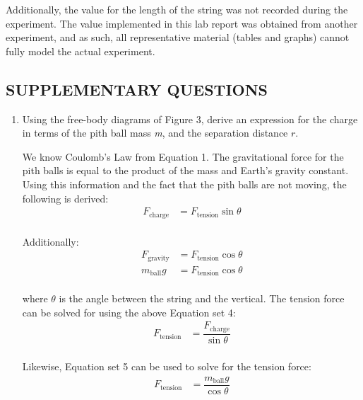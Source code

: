 \documentclass [12pt, letterpaper, twoside] {article}
\begin{document}
Additionally, the value for the length of the string was not recorded during the experiment. The value implemented in this lab report was obtained from another experiment, and as such, all representative material (tables and graphs) cannot fully model the actual experiment.

\subsection* {SUPPLEMENTARY QUESTIONS}
\begin{enumerate}
  \item{Using the free-body diagrams of Figure 3, derive an expression for the charge in terms of the pith ball mass \emph{m}, and the separation distance \(r\).}

    We know Coulomb's Law from Equation 1. The gravitational force for the pith balls is equal to the product of the mass and Earth's gravity constant. Using this information and the fact that the pith balls are not moving, the following is derived:
    \begin{equation*}
      \begin{split}
        F_{\text{charge}} &= F_{\text{tension}}\sin{\theta} \\
      \end{split}
    \end{equation*}

    \noindent
    Additionally:
    \begin{equation}
      \begin{split}
        F_{\text{gravity}} &= F_{\text{tension}}\cos{\theta} \\
        m_{\text{ball}}g &= F_{\text{tension}}\cos{\theta} \\
      \end{split}
    \end{equation}

    \noindent
    where \(\theta\) is the angle between the string and the vertical. The tension force can be solved for using the above Equation set 4:
    \begin{equation}
      \begin{split}
        F_{\text{tension}} &= \dfrac{F_{\text{charge}}}{\sin{\theta}} \\
      \end{split}
    \end{equation}

    \noindent
    Likewise, Equation set 5 can be used to solve for the tension force:
    \begin{equation}
      \begin{split}
        F_{\text{tension}} &= \dfrac{m_{\text{ball}}g}{\cos{\theta}}
      \end{split}
    \end{equation}


\end{enumerate}
\end{document}
